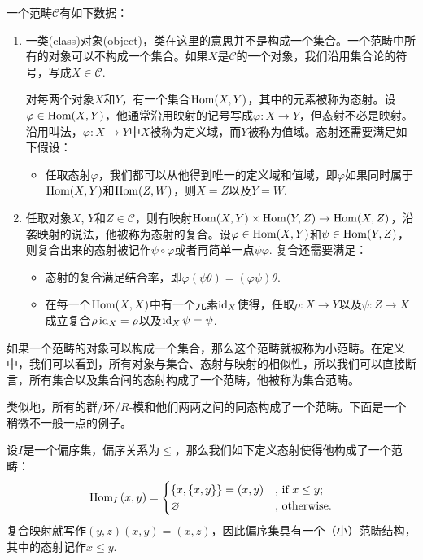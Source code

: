 \para 一个范畴$\mathcal{C}$有如下数据：
\begin{enumerate}
\item 一类(class)对象(object)，类在这里的意思并不是构成一个集合。一个范畴中所有的对象可以不构成一个集合。如果$X$是$\mathcal{C}$的一个对象，我们沿用集合论的符号，写成$X\in \mathcal{C}$.

对每两个对象$X$和$Y$，有一个集合$\operatorname{Hom}(X,Y)$，其中的元素被称为态射。设$\varphi\in \operatorname{Hom}(X,Y)$，他通常沿用映射的记号写成$\varphi:X\to Y$，但态射不必是映射。沿用叫法，$\varphi:X\to Y$中$X$被称为定义域，而$Y$被称为值域。态射还需要满足如下假设：

\begin{itemize}

\item 任取态射$\varphi$，我们都可以从他得到唯一的定义域和值域，即$\varphi$如果同时属于$\operatorname{Hom}(X,Y)$和$\operatorname{Hom}(Z,W)$，则$X=Z$以及$Y=W$.

\end{itemize}

\item 任取对象$X$, $Y$和$Z\in \mathcal{C}$，则有映射$\operatorname{Hom}(X,Y)\times \operatorname{Hom}(Y,Z)\to \operatorname{Hom}(X,Z)$，沿袭映射的说法，他被称为态射的复合。设$\varphi\in \operatorname{Hom}(X,Y)$和$\psi \in \operatorname{Hom}(Y,Z)$，则复合出来的态射被记作$\psi\circ \varphi$或者再简单一点$\psi\varphi$. 复合还需要满足：
\begin{itemize}

\item 态射的复合满足结合率，即$\varphi(\psi\theta)=(\varphi\psi)\theta$.

\item 在每一个$\operatorname{Hom}(X,X)$中有一个元素$\operatorname{id}_X$使得，任取$\rho:X\to Y$以及$\psi:Z\to X$成立复合$\rho\operatorname{id}_X=\rho$以及$\operatorname{id}_X\psi=\psi$.
\end{itemize}
\end{enumerate}

如果一个范畴的对象可以构成一个集合，那么这个范畴就被称为小范畴。在定义中，我们可以看到，所有对象与集合、态射与映射的相似性，所以我们可以直接断言，所有集合以及集合间的态射构成了一个范畴，他被称为集合范畴。

类似地，所有的群/环/$R$-模和他们两两之间的同态构成了一个范畴。下面是一个稍微不一般一点的例子。

\para 设$I$是一个偏序集，偏序关系为$\leq$，那么我们如下定义态射使得他构成了一个范畴：
\[
	\operatorname{Hom}_{I}\left(x,y\right)=\begin{cases}
	\{x,\{x,y\}\}=(x,y)&\text{, if }x\leq y\text{;}\\
	\varnothing&\text{, otherwise}.
	\end{cases}
\]
复合映射就写作$(y,z)(x,y)=(x,z)$，因此偏序集具有一个（小）范畴结构，其中的态射记作$x\leq y$.


